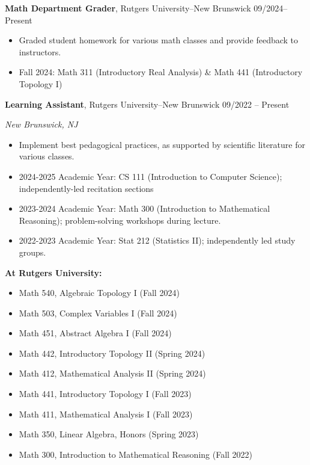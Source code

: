 \documentclass{article}
\begin{document}
		\noindent \textbf{Math Department Grader}, Rutgers University--New Brunswick \hfill 09/2024--Present 
		\begin{itemize}[noitemsep, nolistsep]
				\item Graded student homework for various math classes and provide feedback to instructors. 
				\item Fall 2024: Math 311 (Introductory Real Analysis) \& Math 441 (Introductory Topology I)
		\end{itemize}
		\vspace{0.5em}
		\noindent \textbf{Learning Assistant}, Rutgers University--New Brunswick \hfill 09/2022 -- Present \par 
		\noindent \textit{New Brunswick, NJ} 
		\begin{itemize}[noitemsep, nolistsep]
				\item Implement best pedagogical practices, as supported by scientific literature for various classes. 
				\item 2024-2025 Academic Year: CS 111 (Introduction to Computer Science); independently-led recitation sections
				\item 2023-2024 Academic Year: Math 300 (Introduction to Mathematical Reasoning); problem-solving workshops during lecture.
				\item 2022-2023 Academic Year: Stat 212 (Statistics II); independently led study groups.
		\end{itemize}
		\vspace{1.0em}

		\noindent \textbf{At Rutgers University:}
		\begin{itemize}[noitemsep, nolistsep]
				\item Math 540, Algebraic Topology I (Fall 2024)
				\item Math 503, Complex Variables I (Fall 2024) 
				\item Math 451, Abstract Algebra I (Fall 2024) 
				\item Math 442, Introductory Topology II (Spring 2024) 
				\item Math 412, Mathematical Analysis II (Spring 2024) 
				\item Math 441, Introductory Topology I (Fall 2023) 
				\item Math 411, Mathematical Analysis I (Fall 2023) 
				\item Math 350, Linear Algebra, Honors (Spring 2023) 
				\item Math 300, Introduction to Mathematical Reasoning (Fall 2022)
		\end{itemize}
		\vspace{1.0em} 
\end{document}
